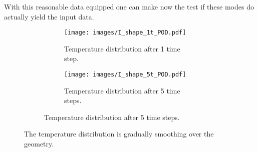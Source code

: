 \documentclass{scrartcl}
\begin{document}
	With this reasonable data equipped one can make now the test if these modes do actually yield the input data.
	\begin{figure}[H]
		\begin{figure}[H]
			\begin{minipage}[t]{0.5\linewidth}
				\begin{subfigure}[t]{\linewidth}
					\texttt{[image: images/I\_shape\_1t\_POD.pdf]}
					\caption{Temperature distribution after 1 time step.}
				\end{subfigure}
			\end{minipage}
			\begin{minipage}[t]{0.5\linewidth}
				\begin{subfigure}[t]{\linewidth}
					\texttt{[image: images/I\_shape\_5t\_POD.pdf]}
					\caption{Temperature distribution after 5 time steps.}
				\end{subfigure}
			\end{minipage}
		\end{figure}
		\caption{The temperature distribution is gradually smoothing over the geometry.}
		\label{}
	\end{figure}
\end{document}
